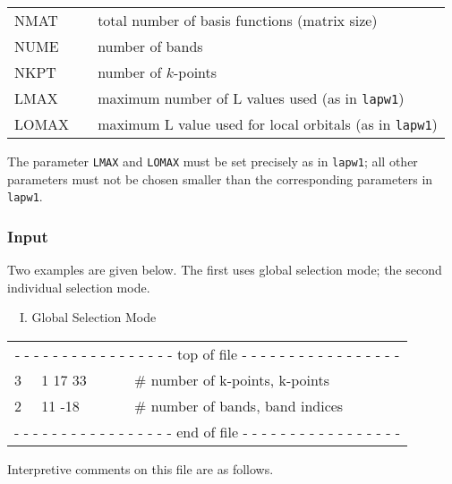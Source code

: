 \documentclass[10pt,fleqn,a4paper,twosided]{article}
\begin{document}
\vspace*{.25cm}
\begin{tabular}{lll}
NMAT  & & total number of basis functions (matrix size) \\[-.0ex]
NUME  & & number of bands \\[-.0ex]
NKPT  & & number of $k$-points \\ [-.0ex]
LMAX  & & maximum number of L values used (as in {\tt lapw1}) \\[-.0ex]
LOMAX & & maximum L value used for local orbitals (as in {\tt lapw1}) \\
\end{tabular}
\vspace*{.25cm}

The parameter {\tt LMAX} and {\tt LOMAX} must be set precisely as in 
{\tt lapw1}; all other parameters must not be chosen smaller than the
corresponding parameters in {\tt lapw1}.

\subsubsection{Input}

Two examples are given below. The first uses global selection mode; the 
second individual selection mode.\vspace{0.5cm}

{\ \ I. Global Selection Mode}

\vspace*{.25cm}
{\tt \begin{tabular}{llll}
\multicolumn{4}{c}{
- - - - - - - - - - - - - - - - - top of file - - - - - - - - - - - - - - - - -}\\[-.0ex]
3 & 1 17 33  & & \textmd{\#} number of k-points, k-points \\[-.0ex]
2 & 11 -18   & & \textmd{\#} number of bands, band indices \\[-.0ex]
\multicolumn{4}{c}{
- - - - - - - - - - - - - - - - - end of file - - - - - - - - - - - - - - - - -}\\
\end{tabular}}
\vspace*{.5cm}

Interpretive comments on this file are as follows.
\end{document}
